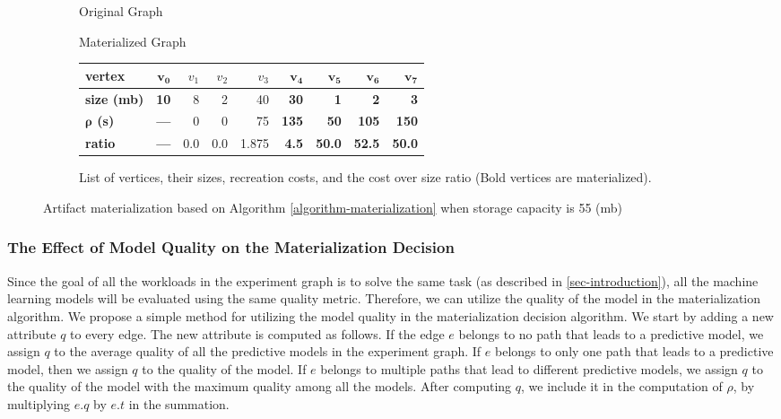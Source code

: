 \begin{figure}
\begin{subfigure}{0.5\linewidth}
\centering

\caption{Original Graph}
\label{fig-materialization-example}
\end{subfigure}%
\begin{subfigure}{0.5\linewidth}
\centering

\caption{Materialized Graph}
\label{fig-materialization-example}
\end{subfigure}
\begin{subfigure}{\linewidth}
\begin{tabular}{l||>{\bfseries}r|r|r|r|>{\bfseries}r|>{\bfseries}r|>{\bfseries}r|>{\bfseries}r}
\hline
\textbf{vertex} & $\boldsymbol{v_0}$ & $v_1$ & $v_2$ & $v_3$ & $\boldsymbol{v_4}$ & $\boldsymbol{v_5}$ & $\boldsymbol{v_6}$ & $\boldsymbol{v_7}$  \\
\hline
\textbf{size (mb)}    & 10 & 8 & 2 & 40 & 30 & 1 & 2 & 3            \\
\textbf{$\boldsymbol{\rho}$ (s)} & ---   & 0 & 0& 75 & 135 & 50 & 105 & 150	  \\
\textbf{ratio}& --- &0.0 & 0.0 & 1.875 & 4.5 & 50.0 & 52.5 & 50.0 \\
\hline
\end{tabular}
\caption{List of vertices, their sizes, recreation costs, and the cost over size ratio (Bold vertices are materialized).}
\end{subfigure}
\caption{Artifact materialization based on Algorithm \ref{algorithm-materialization} when storage capacity is 55 (mb)}
\end{figure}

\subsubsection{The Effect of Model Quality on the Materialization Decision}
Since the goal of all the workloads in the experiment graph is to solve the same task (as described in \ref{sec-introduction}), all the machine learning models will be evaluated using the same quality metric.
Therefore, we can utilize the quality of the model in the materialization algorithm.
We propose a simple method for utilizing the model quality in the materialization decision algorithm.
We start by adding a new attribute $q$ to every edge.
The new attribute is computed as follows.
If the edge $e$ belongs to no path that leads to a predictive model, we assign $q$ to the average quality of all the predictive models in the experiment graph.
If $e$ belongs to only one path that leads to a predictive model, then we assign $q$ to the quality of the model.
If $e$ belongs to multiple paths that lead to different predictive models, we assign $q$ to the quality of the model with the maximum quality among all the models.
After computing $q$, we include it in the computation of $\rho$, by multiplying $e.q$ by $e.t$ in the summation. 

